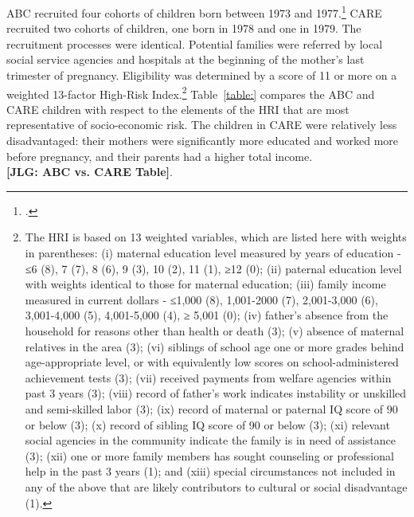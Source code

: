 \noindent ABC recruited four cohorts of children born between 1973 and 1977.\footnote{\citet{Feagans_1996_Childrens-Talk}.} CARE recruited two cohorts of children, one  born in 1978 and one in 1979. The recruitment processes were identical. Potential families were referred by local social service agencies and hospitals at the beginning of the mother's last trimester of pregnancy. Eligibility was determined by a score of 11 or more on a weighted 13-factor High-Risk Index.\footnote{The HRI is based on 13 weighted variables, which are listed here with weights in parentheses: (i) maternal education level measured by years of education - ≤6 (8), 7 (7), 8 (6), 9 (3), 10 (2), 11 (1), ≥12 (0); (ii) paternal education level with weights identical to those for maternal education; (iii) family income measured in current dollars - ≤1,000 (8), 1,001-2000 (7), 2,001-3,000 (6), 3,001-4,000 (5), 4,001-5,000 (4), ≥ 5,001 (0); (iv) father’s absence from the household for reasons other than health or death (3); (v) absence of maternal relatives in the area (3); (vi) siblings of school age one or more grades behind age-appropriate level, or with equivalently low scores on school-administered achievement tests (3); (vii) received payments from welfare agencies within past 3 years (3); (viii) record of father's work indicates instability or unskilled and semi-skilled labor (3); (ix) record of maternal or paternal IQ score of 90 or below (3); (x) record of sibling IQ score of 90 or below (3); (xi) relevant social agencies in the community indicate the family is in need of assistance (3); (xii) one or more family members has sought counseling or professional help in the past 3 years (1); and (xiii) special circumstances not included in any of the above that are likely contributors to cultural or social disadvantage (1).} Table~\ref{table:} compares the ABC and CARE children with respect to the elements of the HRI that are most representative of socio-economic risk. The children in CARE were relatively less disadvantaged: their mothers were significantly more educated and worked more before pregnancy, and their parents had a higher total income.\\

\noindent \textbf{[JLG: ABC vs. CARE Table]}.\\

